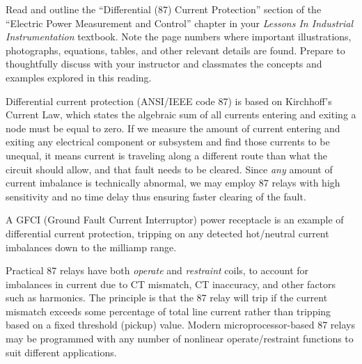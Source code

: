 

Read and outline the ``Differential (87) Current Protection'' section of the ``Electric Power Measurement and Control'' chapter in your {\it Lessons In Industrial Instrumentation} textbook.  Note the page numbers where important illustrations, photographs, equations, tables, and other relevant details are found.  Prepare to thoughtfully discuss with your instructor and classmates the concepts and examples explored in this reading.













Differential current protection (ANSI/IEEE code 87) is based on Kirchhoff's Current Law, which states the algebraic sum of all currents entering and exiting a node must be equal to zero.  If we measure the amount of current entering and exiting any electrical component or subsystem and find those currents to be unequal, it means current is traveling along a different route than what the circuit should allow, and that fault needs to be cleared.  Since {\it any} amount of current imbalance is technically abnormal, we may employ 87 relays with high sensitivity and no time delay thus ensuring faster clearing of the fault.

\vskip 10pt

A GFCI (Ground Fault Current Interruptor) power receptacle is an example of differential current protection, tripping on any detected hot/neutral current imbalances down to the milliamp range.

\vskip 10pt

Practical 87 relays have both {\it operate} and {\it restraint} coils, to account for imbalances in current due to CT mismatch, CT inaccuracy, and other factors such as harmonics.  The principle is that the 87 relay will trip if the current mismatch exceeds some percentage of total line current rather than tripping based on a fixed threshold (pickup) value.  Modern microprocessor-based 87 relays may be programmed with any number of nonlinear operate/restraint functions to suit different applications.

